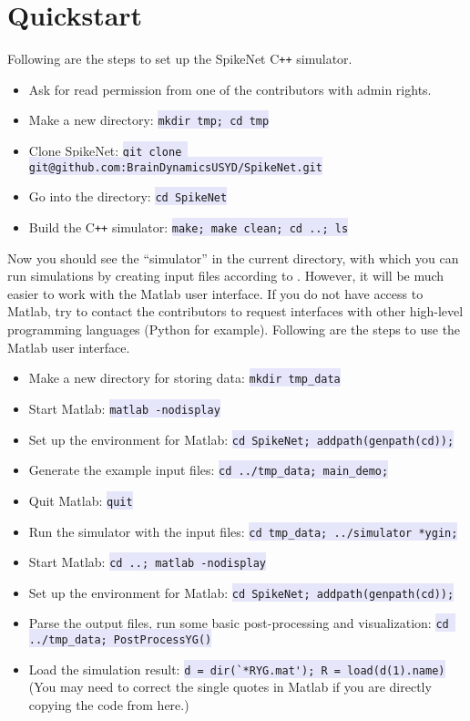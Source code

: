 \documentclass{article}
\newcommand{\mylstinline}[1] {\colorbox{Lavender}{\lstinline[basicstyle=\ttfamily\footnotesize\color{Black}]|#1|} }
\begin{document}
\section{Quickstart}
Following are the steps to set up the SpikeNet C\texttt{++} simulator.
\begin{itemize}
\item Ask for read permission from one of the contributors with admin rights.
\item Make a new directory: \mylstinline{mkdir tmp; cd tmp}
\item Clone SpikeNet: \mylstinline{git clone git@github.com:BrainDynamicsUSYD/SpikeNet.git}
\item Go into the directory: \mylstinline{cd SpikeNet}
\item Build the C\texttt{++} simulator:  \mylstinline{make; make clean; cd ..; ls}
\end{itemize}
Now you should see the ``simulator'' in the current directory, with which you can run simulations by creating input files according to .
However, it will be much easier to work with the Matlab user interface.
If you do not have access to Matlab, try to contact the contributors to request interfaces with other high-level programming languages (Python for example).
Following are the steps to use the Matlab user interface.
\begin{itemize}
\item Make a new directory for storing data: \mylstinline{mkdir tmp_data}
\item Start Matlab: \mylstinline{matlab -nodisplay}
\item Set up the environment for Matlab: \mylstinline{cd SpikeNet; addpath(genpath(cd));}
\item Generate the example input files: \mylstinline{cd ../tmp_data; main_demo;}
\item Quit Matlab: \mylstinline{quit}
\item Run the simulator with the input files: \mylstinline{cd tmp_data; ../simulator *ygin;}
\item Start Matlab: \mylstinline{cd ..; matlab -nodisplay}
\item Set up the environment for Matlab: \mylstinline{cd SpikeNet; addpath(genpath(cd));}
\item Parse the output files, run some basic post-processing and visualization: \mylstinline{cd ../tmp_data; PostProcessYG()}
\item Load the simulation result: \mylstinline{d = dir(`*RYG.mat'); R = load(d(1).name)} (You may need to correct the single quotes in Matlab if you are directly copying the code from here.)
\end{itemize}
\end{document}
